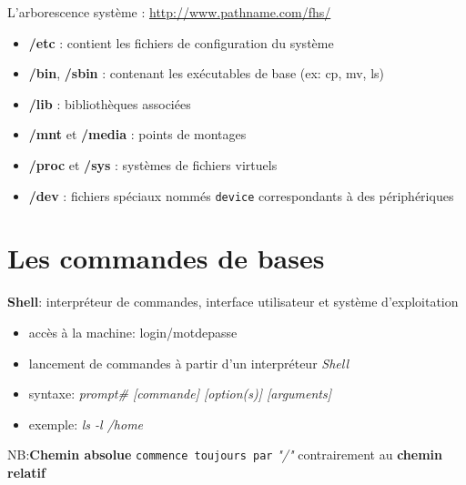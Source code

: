 \documentclass[french]{beamer}
\begin{document}
 \begin{frame}
 L'arborescence système : \url{http://www.pathname.com/fhs/}
	\begin{itemize}
	\item \textbf{/etc} : contient les fichiers de configuration du système
	\item \textbf{/bin}, \textbf{/sbin} : contenant les exécutables de base (ex: cp, mv, ls)
    \item \textbf{/lib} : bibliothèques associées 
    \item \textbf{/mnt} et \textbf{/media} : points de montages       
    \item \textbf{/proc} et \textbf{/sys} : systèmes de fichiers virtuels
    \item \textbf{/dev} : fichiers spéciaux nommés \texttt{device} correspondants à des périphériques
    \end{itemize}
\end{frame}


\section{Les commandes de bases} 
\frame{\tableofcontents[current]}

\begin{frame}
\textbf{Shell}: interpréteur de commandes, interface utilisateur et système
d'exploitation
    \begin{itemize}
    \item accès à la machine: login/motdepasse 
    \item lancement de commandes à partir d'un interpréteur \textit{Shell}
    \item syntaxe: \textit{prompt\# [commande] [option(s)] [arguments]}
    \item exemple: \textit{ls -l /home}
    \end{itemize}
NB:\textbf{Chemin absolue} \texttt{commence toujours par} \textit{"/"} contrairement au \textbf{chemin relatif}
\end{frame}
\end{document}
